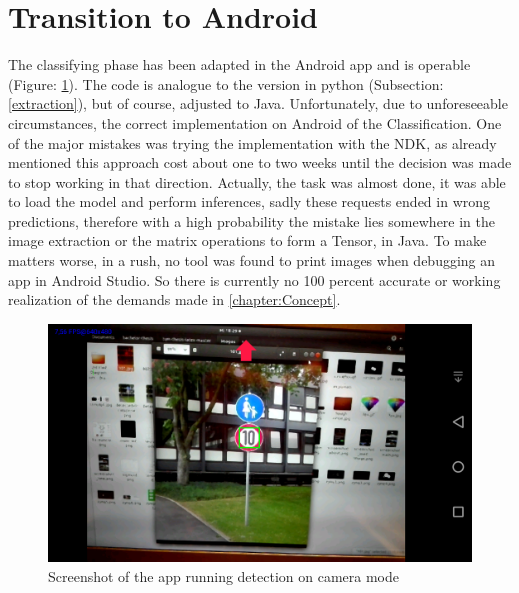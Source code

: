 \section{Transition to Android}
The classifying phase has been adapted in the Android app and is operable (Figure: \ref{fig:screenfun}). The code is analogue to the version in python (Subsection: \ref{extraction}), but of course, adjusted to Java. 
Unfortunately, due to unforeseeable circumstances, the correct implementation on Android of the Classification. One of the major mistakes was trying the implementation with the NDK, as already mentioned this approach cost about one to two weeks until the decision was made to stop working in that direction. Actually, the task was almost done, it was able to load the model and perform inferences, sadly these requests ended in wrong predictions, therefore with a high probability the mistake lies somewhere in the image extraction or the matrix operations to form a Tensor, in Java. To make matters worse, in a rush, no tool was found to print images when debugging an app in Android Studio. So there is currently no 100 percent accurate or working realization of the demands made in \ref{chapter:Concept}. 
\newline

\begin{figure}[H]
	\centering
	\includegraphics[width=\linewidth]{images/screenshotfun.png}
	\caption{Screenshot of the app running detection on camera mode}\label{fig:screenfun}
\end{figure}